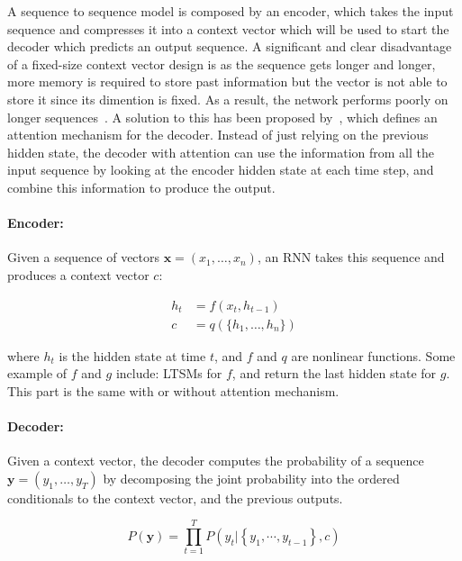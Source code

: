 A sequence to sequence model is composed by an encoder, which takes the input sequence and compresses it into a context vector which will be used to start the decoder which predicts an output sequence.  A significant and clear disadvantage of a fixed-size context vector design is as the sequence gets longer and longer, more memory is required to store past information but the vector is not able to store it since its dimention is fixed. As a result, the network performs poorly on longer sequences~\citep{cho-etal-2014-properties}. A solution to this has been proposed by~\cite{bahdanau2014neural}, which defines an attention mechanism for the decoder. Instead of just relying on the previous hidden state, the decoder with attention can use the information from all the input sequence by looking at the encoder hidden state at each time step, and combine this information to produce the output.

\paragraph{Encoder:} Given a sequence of vectors $\textbf{x} = (x_1, \dots, x_n)$, an RNN takes this sequence and produces a context vector $c$:

\begin{equation}
    \begin{split}
        h_t & = f(x_t, h_{t-1})\\
        c & = q(\{h_1, \dots, h_n\}) 
    \end{split}
\end{equation}

where $h_t$ is the hidden state at time $t$, and $f$ and $q$ are nonlinear functions. Some example of $f$ and $g$ include: LTSMs for $f$, and return the last hidden state for $g$. This part is the same with or without attention mechanism.



\paragraph{Decoder:} Given a context vector, the decoder computes the probability of a sequence $\textbf{y} = (y_1, \dots, y_T)$ by decomposing the joint probability into the ordered conditionals to the context vector, and the previous outputs.

\begin{equation}
P(\mathbf{y})=\prod_{t=1}^{T} P\left(y_{t} |\left\{y_{1}, \cdots, y_{t-1}\right\}, c\right)
\end{equation}

